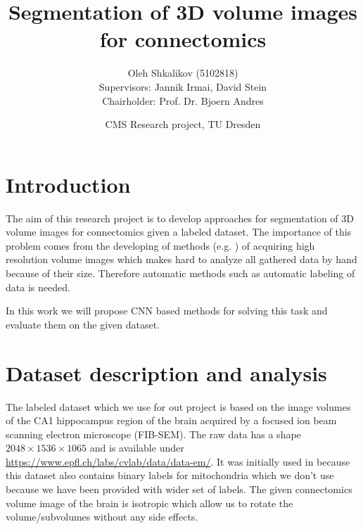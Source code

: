 \documentclass[twocolumn, a4paper]{article}
\theoremstyle{definition}
\begin{document}
\title{\bf\Large Segmentation of 3D volume images for connectomics}
\author{Oleh Shkalikov\texorpdfstring{ (5102818)
\\[0.7em]{\small Supervisors: Jannik Irmai, David Stein}
\\{\small Chairholder: Prof. Dr. Bjoern Andres}}{}}
\date{CMS Research project, TU Dresden}

\twocolumn[
    \begin{@twocolumnfalse}
        \maketitle

        \vspace{7ex}
    \end{@twocolumnfalse}
]

\section{Introduction}
The aim of this research project is to develop approaches
for segmentation of 3D volume images for connectomics given
a labeled dataset. The importance of this problem comes from the
developing of methods (e.g. \cite{10.7554/eLife.25916}) of acquiring high resolution volume images
which makes hard to analyze all gathered data by hand because of their size.
Therefore automatic methods such as automatic labeling of data is needed.

In this work we will propose CNN based methods for solving this task and evaluate them
on the given dataset.

\section{Dataset description and analysis}

The labeled dataset which we use for out project is based on
the image volumes of the CA1 hippocampus region of the brain
acquired by a focused ion beam scanning electron microscope (FIB-SEM).
The raw data has a shape \( 2048 \times 1536 \times 1065 \)  and is available under
\url{https://www.epfl.ch/labs/cvlab/data/data-em/}. It was initially used in
\cite{lucchi2011supervoxel,lucchi2013learning} because this dataset also contains binary
labels for mitochondria which we don't use because we have been provided with wider
set of labels. The given connectomics volume image of the brain is
isotropic which allow us to rotate the volume/subvolumes without any side effects.
\end{document}
